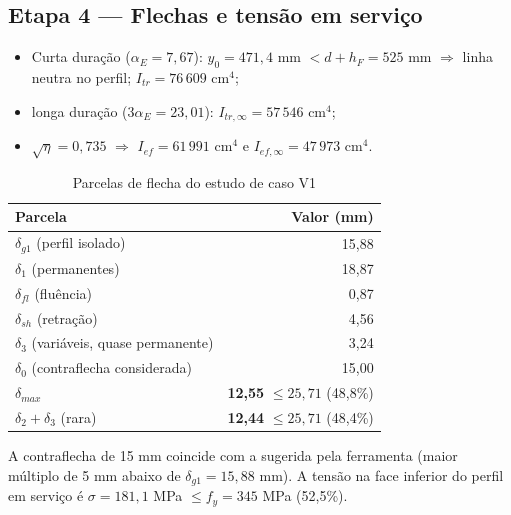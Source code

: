 \subsection{Etapa 4 --- Flechas e tensão em serviço}
\begin{itemize}
\item Curta duração ($\alpha_E = 7{,}67$): $y_0 = 471{,}4$ mm $< d + h_F = 525$ mm \ensuremath{\Rightarrow} linha neutra no perfil; $I_{tr} = 76\,609$ cm\ensuremath{^4};
\item longa duração ($3\alpha_E = 23{,}01$): $I_{tr,\infty} = 57\,546$ cm\ensuremath{^4};
\item $\sqrt{\eta} = 0{,}735$ \ensuremath{\Rightarrow} $I_{ef} = 61\,991$ cm\ensuremath{^4} e $I_{ef,\infty} = 47\,973$ cm\ensuremath{^4}.
\end{itemize}

\begin{table}[htbp]
  \centering
  \caption{Parcelas de flecha do estudo de caso V1}\label{tab:flechas-v1}
  {
  \begin{tabular}{lr}
  \toprule
  Parcela & Valor (mm) \\
  \midrule
  $\delta_{g1}$ (perfil isolado) & 15,88 \\
  $\delta_1$ (permanentes) & 18,87 \\
  $\delta_{fl}$ (fluência) & 0,87 \\
  $\delta_{sh}$ (retração) & 4,56 \\
  $\delta_3$ (variáveis, quase permanente) & 3,24 \\
  $\delta_0$ (contraflecha considerada) & 15,00 \\
  \textbf{$\delta_{max}$} & \textbf{12,55} $\le 25{,}71$ (48,8\%) \\
  \textbf{$\delta_2 + \delta_3$} (rara) & \textbf{12,44} $\le 25{,}71$ (48,4\%) \\
  \bottomrule
  \end{tabular}
  }
\end{table}

A contraflecha de 15 mm coincide com a sugerida pela ferramenta (maior múltiplo de 5 mm abaixo de $\delta_{g1} = 15{,}88$ mm). A tensão na face inferior do perfil em serviço é $\sigma = 181{,}1$ MPa $\le f_y = 345$ MPa (52,5\%).

